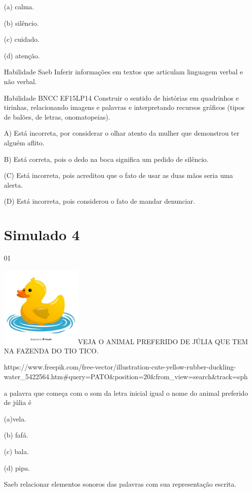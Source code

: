 {{{{{{(a) calma.

(b) silêncio.

(c) cuidado.

(d) atenção.

Habilidade Saeb Inferir informações em textos que articulam linguagem
verbal e não verbal.

Habilidade BNCC EF15LP14 Construir o sentido de histórias em quadrinhos
e tirinhas, relacionando imagens e palavras e interpretando recursos
gráficos (tipos de balões, de letras, onomatopeias).

A) Está incorreta, por considerar o olhar atento da mulher que
demonstrou ter alguém aflito.

B) Está correta, pois o dedo na boca significa um pedido de silêncio.

(C) Está incorreta, pois acreditou que o fato de usar as duas mãos seria
uma alerta.

(D) Está incorreta, pois considerou o fato de mandar denunciar.

\chapter{Simulado 4}

\num{01}

\includegraphics[width=1.58974in,height=1.58974in]{media/image174.jpeg}VEJA
O ANIMAL PREFERIDO DE JÚLIA QUE TEM NA FAZENDA DO TIO TICO.

https://www.freepik.com/free-vector/illustration-cute-yellow-rubber-duckling-water\_5422564.htm\#query=PATO\&position=20\&from\_view=search\&track=sph

a palavra que começa com o som da letra inicial igual o nome do animal
preferido de júlia é

(a)vela.

(b) fafá.

(c) bala.

(d) pipa.

Saeb relacionar elementos sonoros das palavras com sua representação
escrita.

}}}}}}
